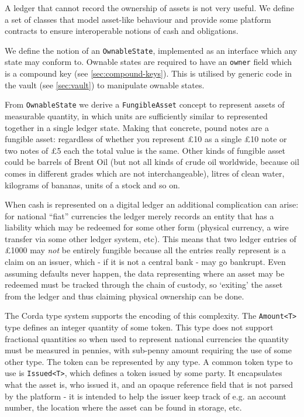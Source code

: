 \documentclass{article}
\begin{document}
A ledger that cannot record the ownership of assets is not very useful. We define a set of classes that model
asset-like behaviour and provide some platform contracts to ensure interoperable notions of cash and obligations.

We define the notion of an \texttt{OwnableState}, implemented as an interface which any state may conform to. Ownable
states are required to have an \texttt{owner} field which is a compound key (see \cref{sec:compound-keys}). This is
utilised by generic code in the vault (see \cref{sec:vault}) to manipulate ownable states.


From \texttt{OwnableState} we derive a \texttt{FungibleAsset} concept to represent assets of measurable quantity, in
which units are sufficiently similar to represented together in a single ledger state. Making that concrete, pound notes
are a fungible asset: regardless of whether you represent \pounds10 as a single \pounds10 note or two notes of \pounds5
each the total value is the same. Other kinds of fungible asset could be barrels of Brent Oil (but not all kinds of
crude oil worldwide, because oil comes in different grades which are not interchangeable), litres of clean water,
kilograms of bananas, units of a stock and so on.

When cash is represented on a digital ledger an additional complication can arise: for national ``fiat'' currencies
the ledger merely records an entity that has a liability which may be redeemed for some other form (physical currency,
a wire transfer via some other ledger system, etc). This means that two ledger entries of \pounds1000 may \emph{not}
be entirely fungible because all the entries really represent is a claim on an issuer, which - if it is not a central
bank - may go bankrupt. Even assuming defaults never happen, the data representing where an asset may be redeemed
must be tracked through the chain of custody, so `exiting' the asset from the ledger and thus claiming physical
ownership can be done.

The Corda type system supports the encoding of this complexity. The \texttt{Amount<T>} type defines an integer
quantity of some token. This type does not support fractional quantities so when used to represent national
currencies the quantity must be measured in pennies, with sub-penny amount requiring the use of some other type.
The token can be represented by any type. A common token type to use is \texttt{Issued<T>}, which defines a token
issued by some party. It encapsulates what the asset is, who issued it, and an opaque reference field that is not
parsed by the platform - it is intended to help the issuer keep track of e.g. an account number, the location where
the asset can be found in storage, etc.
\end{document}
